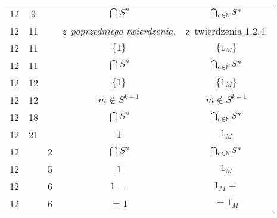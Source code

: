 \documentclass[a4paper,11pt]{article}
\begin{document}
\begin{center}
\begin{tabular}{|c|c|c|c|c|}
    12 &  9 & & $\bigcap S^{ n }$ & $\bigcap_{ n \in \mathbb{N} } S^{ n }$ \\
    12 & 11 & & \textit{z~poprzedniego twierdzenia.}
    & z~twierdzenia 1.2.4. \\
    12 & 11 & & $\{ 1 \}$ & $\{ 1_{ M } \}$ \\
    12 & 11 & & $\bigcap S^{ n }$ & $\bigcap_{ n \in \mathbb{N} } S^{ n }$ \\
    12 & 12 & & $\{ 1 \}$ & $\{ 1_{ M } \}$ \\
    12 & 12 & & $m \!\! \notin \!\! S^{ k + 1 }$ & $m \notin S^{ k + 1 }$ \\
    12 & 18 & & $\bigcap S^{ n }$ & $\bigcap_{ n \in \mathbb{N} } S^{ n }$ \\
    12 & 21 & & $1$ & $1_{ M }$ \\
    12 & &  2 & $\bigcap S^{ n }$ & $\bigcap_{ n \in \mathbb{N} } S^{ n }$ \\
    12 & &  5 & $1$ & $1_{ M }$ \\
    12 & &  6 & $1 =$ & $1_{ M } =$ \\
    12 & &  6 & $= 1$ & $= 1_{ M }$ \\
    \hline
  \end{tabular}





  \newpage


\end{center}
\end{document}
